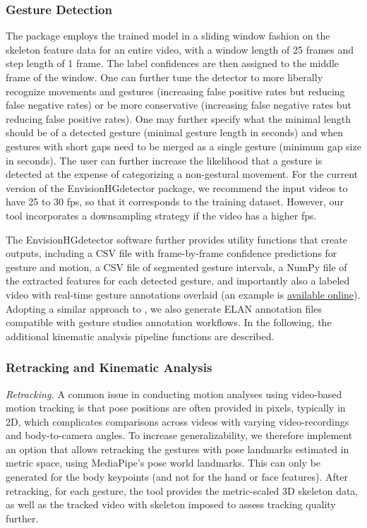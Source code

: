 \documentclass[11pt,smallheadings,cleardoublepage=empty,tocflat,numbers=noenddot,twoside,captions=tableheading]{scrbook}
\begin{document}
\begin{refsection}
\subsubsection{Gesture Detection}
The package employs the trained model in a sliding window fashion on the skeleton feature data for an entire video, with a window length of 25 frames and step length of 1 frame. The label confidences are then assigned to the middle frame of the window. One can further tune the detector to more liberally recognize movements and gestures (increasing false positive rates but reducing false negative rates) or be more conservative (increasing false negative rates but reducing false positive rates). One may further specify what the minimal length should be of a detected gesture (minimal gesture length in seconds) and when gestures with short gaps need to be merged as a single gesture (minimum gap size in seconds). The user can further increase the likelihood that a gesture is detected at the expense of categorizing a non-gestural movement. For the current version of the EnvisionHGdetector package, we recommend the input videos to have 25 to 30 fps, so that it corresponds to the training dataset. However, our tool incorporates a downsampling strategy if the video has a higher fps.

The EnvisionHGdetector software further provides utility functions that create outputs, including a CSV file with frame-by-frame confidence predictions for gesture and motion, a CSV file of segmented gesture intervals, a NumPy file of the extracted features for each detected gesture, and importantly also a labeled video with real-time gesture annotations overlaid (an example is \href{https://osf.io/e4drq}{available online}). Adopting a similar approach to \citet{ienagaSemiautomationGestureAnnotation2022}, we also generate ELAN annotation files compatible with gesture studies annotation workflows. In the following, the additional kinematic analysis pipeline functions are described.

\subsubsection{Retracking and Kinematic Analysis}
\emph{Retracking.}
A common issue in conducting motion analyses using video-based motion tracking is that pose positions are often provided in pixels, typically in 2D, which complicates comparisons across videos with varying video-recordings and body-to-camera angles. To increase generalizability, we therefore implement an option that allows retracking the gestures with pose landmarks estimated in metric space, using MediaPipe's pose world landmarks. This can only be generated for the body keypoints (and not for the hand or face features). After retracking, for each gesture, the tool provides the metric-scaled 3D skeleton data, as well as the tracked video with skeleton imposed to assess tracking quality further.


\end{refsection}
\end{document}
